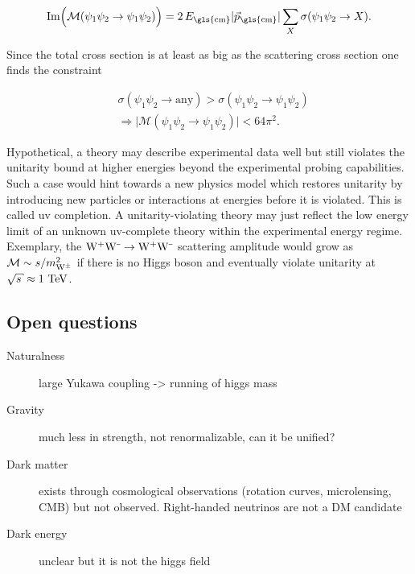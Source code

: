 \begin{equation}
\mathrm{Im}\Big(\mathcal{M}(\psi_{1}\psi_{2}\to\psi_{1}\psi_{2})\Big)=2\,E_\mathrm{\gls{cm}}|\vec{p}_\mathrm{\gls{cm}}|\sum_{X}\sigma(\psi_{1}\psi_{2}\to X).
\end{equation}

Since the total cross section is at least as big as the scattering cross section one finds the constraint

\begin{align}
&\sigma(\psi_{1}\psi_{2}\to \mathrm{any})>\sigma(\psi_{1}\psi_{2}\to \psi_{1}\psi_{2}) \\
&\Rightarrow\Big|\mathcal{M}(\psi_{1}\psi_{2}\to\psi_{1}\psi_{2})\Big|<64\pi^2.
\end{align}


Hypothetical, a theory may describe experimental data well but still violates the unitarity bound at higher energies beyond the experimental probing capabilities. Such a case would hint towards a new physics model which restores unitarity by introducing new particles or interactions at energies before it is violated. This is called \gls{uv} completion. A unitarity-violating theory may just reflect the low energy limit of an unknown \gls{uv}-complete theory within the experimental energy regime. Exemplary,  the $\mathrm{W}^{\rmplus}\mathrm{W}^{\rmminus}\to\mathrm{W}^{\rmplus}\mathrm{W}^{\rmminus}$ scattering amplitude would grow as $\mathcal{M}\sim s/m_{\mathrm{W}^{\pm}}^2$ if there is no Higgs boson and eventually violate unitarity at $\sqrt{s}\approx1~\TeV$.


\subsection{Open questions}

\begin{description}
\item[Naturalness] large Yukawa coupling -> running of higgs mass
\item[Gravity] much less in strength, not renormalizable, can it be unified?
\item[Dark matter] exists through cosmological observations (rotation curves, microlensing, CMB) but not observed. Right-handed neutrinos are not a DM candidate
\item[Dark energy] unclear but it is not the higgs field
\end{description}


